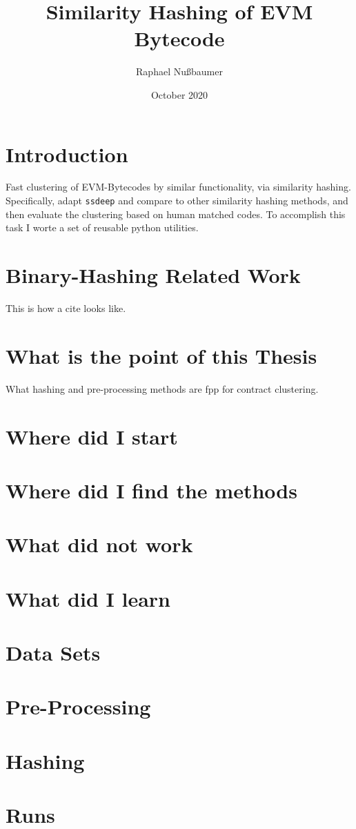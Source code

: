 \documentclass{article}
\title{Similarity Hashing of EVM Bytecode}
\author{Raphael Nußbaumer}
\date{October 2020}
\newcommand{\code}[1]{\mbox{\texttt{#1}}}
\begin{document}
\maketitle

\section{Introduction}

Fast clustering of EVM-Bytecodes by similar functionality, via similarity hashing.
Specifically, adapt \code{ssdeep} and compare to other similarity hashing methods,
and then evaluate the clustering based on human matched codes.
To accomplish this task I worte a set of reusable python utilities.


\section{Binary-Hashing Related Work}

This is how a cite\cite{sung2004static} looks like.

\section{What is the point of this Thesis}
What hashing and pre-processing methods are fpp for contract clustering.

\section{Where did I start}

\section{Where did I find the methods}
\section{What did not work}
\section{What did I learn}


\section{Data Sets}

\section{Pre-Processing}

\section{Hashing}

\section{Runs}

\printbibliography
\end{document}
